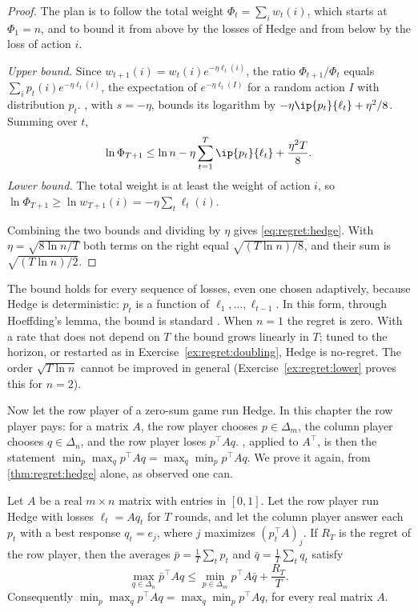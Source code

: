 \begin{refsection}
\begin{proof}
The plan is to follow the total weight $\Phi_t=\sum_iw_t(i)$, which starts at $\Phi_1=n$, and to bound it from above by the losses of Hedge and from below by the loss of action $i$.

\emph{Upper bound.} Since $w_{t+1}(i)=w_t(i)e^{-\eta\ell_t(i)}$, the ratio $\Phi_{t+1}/\Phi_t$ equals $\sum_ip_t(i)e^{-\eta\ell_t(i)}$, the expectation of $e^{-\eta\ell_t(I)}$ for a random action $I$ with distribution $p_t$. , with $s=-\eta$, bounds its logarithm by $-\eta\ip{p_t}{\ell_t}+\eta^2/8$. Summing over $t$,
\[
\ln\Phi_{T+1}\le\ln n-\eta\sum_{t=1}^T\ip{p_t}{\ell_t}+\frac{\eta^2T}8 .
\]
\emph{Lower bound.} The total weight is at least the weight of action $i$, so $\ln\Phi_{T+1}\ge\ln w_{T+1}(i)=-\eta\sum_t\ell_t(i)$.

Combining the two bounds and dividing by $\eta$ gives \eqref{eq:regret:hedge}. With $\eta=\sqrt{8\ln n/T}$ both terms on the right equal $\sqrt{(T\ln n)/8}$, and their sum is $\sqrt{(T\ln n)/2}$.
\end{proof}

The bound holds for every sequence of losses, even one chosen adaptively, because Hedge is deterministic: $p_t$ is a function of $\ell_1,\dots,\ell_{t-1}$. In this form, through Hoeffding's lemma, the bound is standard \parencite{CesaBianchiLugosi2006}. When $n=1$ the regret is zero. With a rate that does not depend on $T$ the bound grows linearly in $T$; tuned to the horizon, or restarted as in Exercise~\ref{ex:regret:doubling}, Hedge is no-regret. The order $\sqrt{T\ln n}$ cannot be improved in general (Exercise~\ref{ex:regret:lower} proves this for $n=2$).

Now let the row player of a zero-sum game run Hedge. In this chapter the row player pays: for a matrix $A$, the row player chooses $p\in\Delta_m$, the column player chooses $q\in\Delta_n$, and the row player loses $p^\top Aq$. , applied to $A^\top$, is then the statement $\min_p\max_qp^\top Aq=\max_q\min_pp^\top Aq$. We prove it again, from \cref{thm:regret:hedge} alone, as \textcite{FreundSchapire1999} observed one can.

\begin{theorem}\label{thm:regret:minimax}
Let $A$ be a real $m\times n$ matrix with entries in $[0,1]$. Let the row player run Hedge with losses $\ell_t=Aq_t$ for $T$ rounds, and let the column player answer each $p_t$ with a best response $q_t=e_j$, where $j$ maximizes $(p_t^\top A)_j$. If $R_T$ is the regret of the row player, then the averages $\bar p=\frac1T\sum_tp_t$ and $\bar q=\frac1T\sum_tq_t$ satisfy
\[
\max_{q\in\Delta_n}\bar p^\top Aq\le\min_{p\in\Delta_m}p^\top A\bar q+\frac{R_T}T .
\]
Consequently $\min_p\max_qp^\top Aq=\max_q\min_pp^\top Aq$, for every real matrix $A$.
\end{theorem}


\end{refsection}
